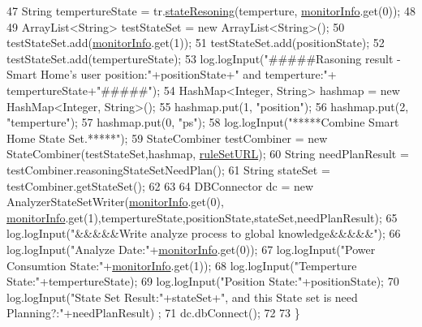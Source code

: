 \begin{DoxyCode}
47         String tempertureState = tr.\mbox{\hyperlink{classcom_1_1github_1_1aites_1_1shlocalaites_1_1analyze_1_1_temperature_state_reasoner_adefc280284e3d6d5f522fa23a83f54f6}{stateResoning}}(temperture,
      \mbox{\hyperlink{classcom_1_1github_1_1aites_1_1shlocalaites_1_1aitesmanager_1_1_analyzer_manager_a158935ea553bae7475409e5a065d6576}{monitorInfo}}.get(0));
48         
49         ArrayList<String> testStateSet = \textcolor{keyword}{new} ArrayList<String>();
50         testStateSet.add(\mbox{\hyperlink{classcom_1_1github_1_1aites_1_1shlocalaites_1_1aitesmanager_1_1_analyzer_manager_a158935ea553bae7475409e5a065d6576}{monitorInfo}}.get(1));
51         testStateSet.add(positionState);
52         testStateSet.add(tempertureState);
53         log.logInput(\textcolor{stringliteral}{"#####Rasoning result - Smart Home's user position:"}+positionState+\textcolor{stringliteral}{" and temperture:"}+
      tempertureState+\textcolor{stringliteral}{"#####"});
54         HashMap<Integer, String> hashmap = \textcolor{keyword}{new} HashMap<Integer, String>();
55         hashmap.put(1, \textcolor{stringliteral}{"position"});
56         hashmap.put(2, \textcolor{stringliteral}{"temperture"});
57         hashmap.put(0, \textcolor{stringliteral}{"ps"});
58         log.logInput(\textcolor{stringliteral}{"*****Combine Smart Home State Set.*****"});
59         StateCombiner testCombiner = \textcolor{keyword}{new} StateCombiner(testStateSet,hashmap,
      \mbox{\hyperlink{classcom_1_1github_1_1aites_1_1shlocalaites_1_1aitesmanager_1_1_analyzer_manager_af225145a9ef067c87f773bbef60ec5d8}{ruleSetURL}});
60         String needPlanResult = testCombiner.reasoningStateSetNeedPlan();
61         String stateSet = testCombiner.getStateSet();
62         
63     
64         DBConnector dc = \textcolor{keyword}{new} AnalyzerStateSetWriter(\mbox{\hyperlink{classcom_1_1github_1_1aites_1_1shlocalaites_1_1aitesmanager_1_1_analyzer_manager_a158935ea553bae7475409e5a065d6576}{monitorInfo}}.get(0),
      \mbox{\hyperlink{classcom_1_1github_1_1aites_1_1shlocalaites_1_1aitesmanager_1_1_analyzer_manager_a158935ea553bae7475409e5a065d6576}{monitorInfo}}.get(1),tempertureState,positionState,stateSet,needPlanResult);
65         log.logInput(\textcolor{stringliteral}{"&&&&&Write analyze process to global knowledge&&&&&"});
66         log.logInput(\textcolor{stringliteral}{"Analyze Date:"}+\mbox{\hyperlink{classcom_1_1github_1_1aites_1_1shlocalaites_1_1aitesmanager_1_1_analyzer_manager_a158935ea553bae7475409e5a065d6576}{monitorInfo}}.get(0));
67         log.logInput(\textcolor{stringliteral}{"Power Consumtion State:"}+\mbox{\hyperlink{classcom_1_1github_1_1aites_1_1shlocalaites_1_1aitesmanager_1_1_analyzer_manager_a158935ea553bae7475409e5a065d6576}{monitorInfo}}.get(1));
68         log.logInput(\textcolor{stringliteral}{"Temperture State:"}+tempertureState);
69         log.logInput(\textcolor{stringliteral}{"Position State:"}+positionState);
70         log.logInput(\textcolor{stringliteral}{"State Set Result:"}+stateSet+\textcolor{stringliteral}{", and this State set is need Planning?:"}+needPlanResult)
      ;
71         dc.dbConnect();
72         
73     \}
\end{DoxyCode}


